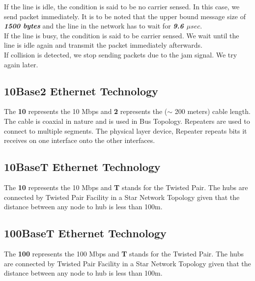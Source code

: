 \documentclass[12pt]{article}
\begin{document}
If the line is idle, the condition is said to be no carrier sensed. In this case, we send packet immediately. It is to be noted that the upper bound message size of \textbf{\textit{1500 bytes}} and the line in the network has to wait for \textbf{\textit{9.6 $\mu sec$}}.  \\

If the line is busy, the condition is said to be carrier sensed. We wait until the line is idle again and transmit the packet immediately afterwards. \\

If collision is detected, we stop sending packets due to the jam signal. We try again later.

\subsection{10Base2 Ethernet Technology}
The \textbf{10} represents the 10 Mbps and \textbf{2} represents the ($\sim$ 200 meters) cable length. The cable is coaxial in nature and is used in Bus Topology. Repeaters are used to connect to multiple segments. The physical layer device, Repeater repeats bits it receives on one interface onto the other interfaces.

\subsection{10BaseT Ethernet Technology}
The \textbf{10} represents the 10 Mbps and \textbf{T} stands for the Twisted Pair. The hubs are connected by Twisted Pair Facility in a Star Network Topology given that the distance between any node to hub is less than 100m.

\subsection{100BaseT Ethernet Technology}
The \textbf{100} represents the 100 Mbps and \textbf{T} stands for the Twisted Pair. The hubs are connected by Twisted Pair Facility in a Star Network Topology given that the distance between any node to hub is less than 100m.
\end{document}
